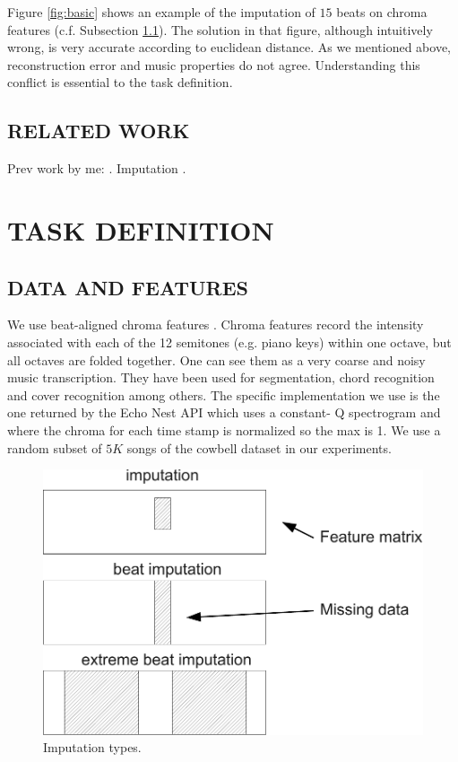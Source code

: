 \documentclass{article}
\begin{document}
Figure \ref{fig:basic} shows an example of the imputation of $15$ beats on chroma features
(c.f. Subsection \ref{ssec:feats}). The solution in that figure, although intuitively wrong, is very
accurate according to euclidean distance. As we mentioned above, reconstruction error and
music properties do not agree. Understanding this conflict is essential to the task
definition.


\subsection{RELATED WORK} 
\label{ssec:relwork}

Prev work by me: \cite{Bertin-Mahieux2010a}. Imputation \cite{Smaragdis2009,Hoffman2010}.


\section{TASK DEFINITION}
\label{sec:task}

\subsection{DATA AND FEATURES}
\label{ssec:feats}
We use beat-aligned chroma features \cite{Ellis2007a}. Chroma features
record the intensity associated with each of the 12 semitones
(e.g. piano keys) within one octave, but all octaves
are folded together. One can see them as a very coarse and
noisy music transcription. They have been used for segmentation, 
chord recognition and cover recognition
among others. The specific implementation we use is the one
returned by the Echo Nest API \cite{EchoNest} which uses a constant-
Q spectrogram and where the chroma for each time stamp is
normalized so the max is 1. We use a random subset of $5K$ songs of
the cowbell dataset \cite{Bertin-Mahieux2010a} in our experiments.

\begin{figure}[t]
\begin{center}
\includegraphics[width=.7\columnwidth]{type_imputation}
\end{center}
\caption{Imputation types.
\label{fig:types}}
\end{figure}
\end{document}
